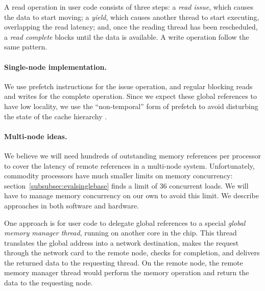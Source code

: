 \documentclass[10pt,nocopyrightspace,preprint]{sigplanconf}
\begin{document}
A read operation in user code consists of three steps: a {\em read
  issue}, which causes the data to start moving; a {\em yield}, which
causes another thread to start executing, overlapping the read
latency; and, once the reading thread has been rescheduled, a {\em
  read complete} blocks until the data is available. A write operation
follow the same pattern.

\paragraph{Single-node implementation.}
We use prefetch instructions for the issue operation, and regular
blocking reads and writes for the complete operation.  Since we expect
these global references to have low locality, we use the
``non-temporal'' form of prefetch to avoid disturbing the state of the
cache hierarchy \cite{intel:swdev}.

\paragraph{Multi-node ideas.}
We believe we will need hundreds of outstanding memory references per
processor to cover the latency of remote references in a multi-node
system. Unfortunately, commodity processors have much smaller limits
on memory concurrency: section~\ref{subsubsec:evalsinglebase} finds a
limit of 36 concurrent loads. We will have to manage memory
concurrency on our own to avoid this limit. We describe approaches in
both software and hardware.

One approach is for user code to delegate global references to a
special {\em global memory manager thread}, running on another core in
the chip. This thread translates the global address into a network
destination, makes the request through the network card to the remote
node, checks for completion, and delivers the returned data to the
requesting thread. On the remote node, the remote memory manager
thread would perform the memory operation and return the data to the
requesting node.

\end{document}
